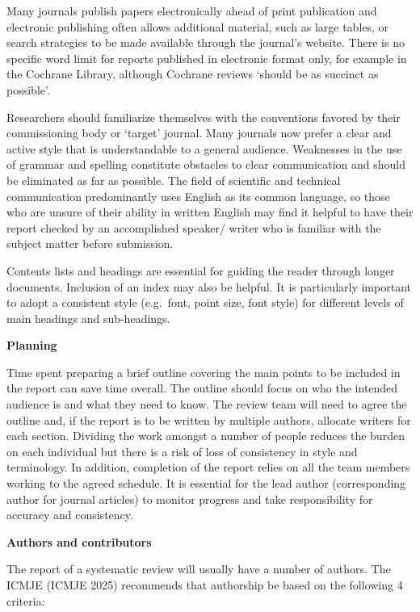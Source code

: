 \documentclass[
  10pt,
  a4paper,
  DIV=11,
  numbers=noendperiod]{scrreprt}
\begin{document}
Many journals publish papers electronically ahead of print publication
and electronic publishing often allows additional material, such as
large tables, or search strategies to be made available through the
journal's website. There is no specific word limit for reports published
in electronic format only, for example in the Cochrane Library, although
Cochrane reviews `should be as succinct as possible'.

Researchers should familiarize themselves with the conventions favored
by their commissioning body or `target' journal. Many journals now
prefer a clear and active style that is understandable to a general
audience. Weaknesses in the use of grammar and spelling constitute
obstacles to clear communication and should be eliminated as far as
possible. The field of scientific and technical communication
predominantly uses English as its common language, so those who are
unsure of their ability in written English may find it helpful to have
their report checked by an accomplished speaker/ writer who is familiar
with the subject matter before submission.

Contents lists and headings are essential for guiding the reader through
longer documents. Inclusion of an index may also be helpful. It is
particularly important to adopt a consistent style (e.g.~font, point
size, font style) for different levels of main headings and
sub-headings.

\textbf{Planning}

Time spent preparing a brief outline covering the main points to be
included in the report can save time overall. The outline should focus
on who the intended audience is and what they need to know. The review
team will need to agree the outline and, if the report is to be written
by multiple authors, allocate writers for each section. Dividing the
work amongst a number of people reduces the burden on each individual
but there is a risk of loss of consistency in style and terminology. In
addition, completion of the report relies on all the team members
working to the agreed schedule. It is essential for the lead author
(corresponding author for journal articles) to monitor progress and take
responsibility for accuracy and consistency.

\textbf{Authors and contributors}

The report of a systematic review will usually have a number of authors.
The ICMJE (ICMJE 2025) recommends that authorship be based on the
following 4 criteria:
\end{document}
